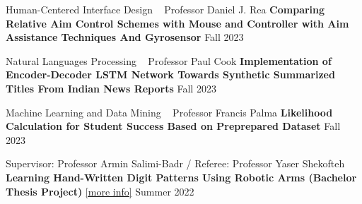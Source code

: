   \begin{cventries}
    \cventry
    {Human-Centered Interface Design ~ Professor Daniel J. Rea}
    {\textbf {Comparing Relative Aim Control Schemes with Mouse and Controller with Aim Assistance Techniques And Gyrosensor}
    }
    {}
    {Fall 2023}
    {}
    \vspace{0.0 cm}

  \end{cventries}
  \begin{cventries}
    \cventry
    {Natural Languages Processing ~ Professor Paul Cook}
    {\textbf {Implementation of Encoder-Decoder LSTM Network Towards Synthetic Summarized Titles From Indian News Reports}}
    {}
    {Fall 2023}
    {}
    \vspace{0.0 cm}
  
  \end{cventries}
  \begin{cventries}
    \cventry
    {Machine Learning and Data Mining ~ Professor Francis Palma}
    {\textbf {Likelihood Calculation for Student Success Based on Preprepared Dataset}}
    {}
    {Fall 2023}
    {}
    \vspace{0.0 cm}
  
  
  \end{cventries}
  \begin{cventries}
    \cventry
    {Supervisor: Professor Armin Salimi-Badr / Referee: Professor Yaser Shekofteh}
    {\textbf {Learning Hand-Written Digit Patterns Using Robotic Arms (Bachelor Thesis Project)}
    \href{https://ph504.github.io/projects/projects-1/}{\textcolor{cobalt}{[more info]}}}
    {}
    {Summer 2022}
    {}
    \vspace{0.0 cm}
  \end{cventries}
